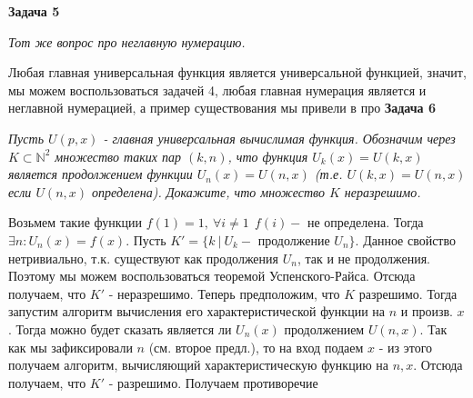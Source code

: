\documentclass{article}
\begin{document}
\newline \newline
 \noindent \textbf{Задача 5}
\begin{center}
\textit{Тот же вопрос про неглавную нумерацию.} 
\end{center}
Любая главная универсальная функция является универсальной функцией, значит, мы можем воспользоваться задачей 4, любая главная нумерация является и неглавной нумерацией, а пример существования мы привели в про
\newline \newline
 \noindent \textbf{Задача 6}
\begin{center}
\textit{Пусть $U(p,x)$ - главная универсальная вычислимая функция. Обозначим через $K \subset\mathbb{N}^2$ множество таких пар $(k,n)$, что функция $U_k(x)=U(k,x)$ является продолжением функции $U_n(x)=U(n,x)$ (т.е. $U(k,x)=U(n,x)$ если $U(n,x)$ определена). Докажите, что множество $K$ неразрешимо.}
\end{center}
Возьмем такие функции $f(1)=1,~\forall i\neq1 ~~f(i) -$ не определена. Тогда $\exists n : U_n(x)=f(x)$.
Пусть
$K'=\{k~|~U_k-$ продолжение $U_n\}$. Данное свойство нетривиально, т.к. существуют как продолжения $U_n$, так и не продолжения. Поэтому мы можем воспользоваться теоремой Успенского-Райса. Отсюда получаем, что $K'$ - неразрешимо.
Теперь предположим, что $K$ разрешимо. Тогда запустим алгоритм вычисления его характеристической функции на $n$ и произв. $x$. Тогда можно будет сказать является ли $U_n(x)$ продолжением $U(n,x)$. Так как мы зафиксировали $n$ (см. второе предл.), то на вход подаем $x$ - из этого получаем алгоритм, вычисляющий характеристическую функцию на $n,x$. Отсюда получаем, что $K'$ - разрешимо. Получаем противоречие
\newline \newline
 
\end{document}
